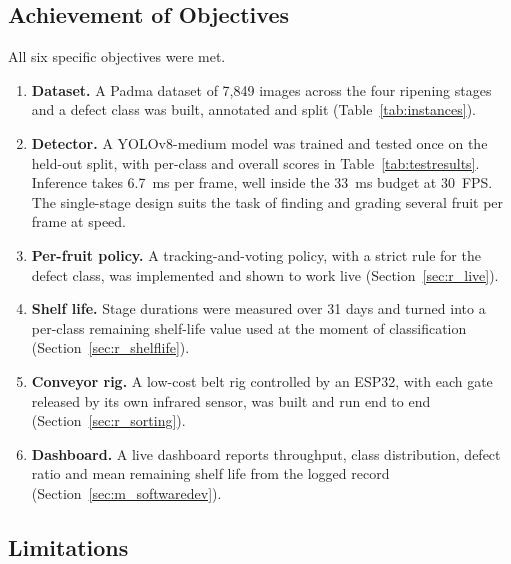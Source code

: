 \subsection{Achievement of Objectives}
\label{sec:c_objectives}

All six specific objectives were met.

\begin{enumerate}
    \item \textbf{Dataset.} A Padma dataset of 7{,}849 images across the four ripening stages and a defect class was built, annotated and split (Table~\ref{tab:instances}).
    \item \textbf{Detector.} A YOLOv8-medium model was trained and tested once on the held-out split, with per-class and overall scores in Table~\ref{tab:testresults}. Inference takes 6.7~ms per frame, well inside the 33~ms budget at 30~\acrshort{FPS}. The single-stage design suits the task of finding and grading several fruit per frame at speed.
    \item \textbf{Per-fruit policy.} A tracking-and-voting policy, with a strict rule for the defect class, was implemented and shown to work live (Section~\ref{sec:r_live}).
    \item \textbf{Shelf life.} Stage durations were measured over 31 days and turned into a per-class remaining shelf-life value used at the moment of classification (Section~\ref{sec:r_shelflife}).
    \item \textbf{Conveyor rig.} A low-cost belt rig controlled by an ESP32, with each gate released by its own infrared sensor, was built and run end to end (Section~\ref{sec:r_sorting}).
    \item \textbf{Dashboard.} A live dashboard reports throughput, class distribution, defect ratio and mean remaining shelf life from the logged record (Section~\ref{sec:m_softwaredev}).
\end{enumerate}

\subsection{Limitations}
\label{sec:c_limitations}

